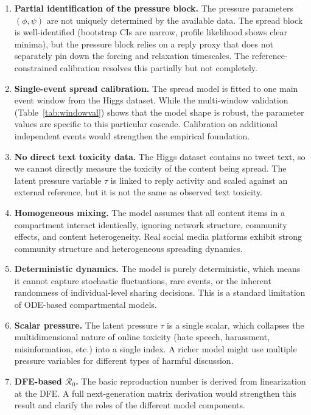 \documentclass[11pt]{article}
\begin{document}
\begin{enumerate}[leftmargin=1.5em]
    \item \textbf{Partial identification of the pressure block.} The pressure parameters $(\phi, \psi)$ are not uniquely determined by the available data. The spread block is well-identified (bootstrap CIs are narrow, profile likelihood shows clear minima), but the pressure block relies on a reply proxy that does not separately pin down the forcing and relaxation timescales. The reference-constrained calibration resolves this partially but not completely.

    \item \textbf{Single-event spread calibration.} The spread model is fitted to one main event window from the Higgs dataset. While the multi-window validation (Table~\ref{tab:windowval}) shows that the model shape is robust, the parameter values are specific to this particular cascade. Calibration on additional independent events would strengthen the empirical foundation.

    \item \textbf{No direct text toxicity data.} The Higgs dataset contains no tweet text, so we cannot directly measure the toxicity of the content being spread. The latent pressure variable $\tau$ is linked to reply activity and scaled against an external reference, but it is not the same as observed text toxicity.

    \item \textbf{Homogeneous mixing.} The model assumes that all content items in a compartment interact identically, ignoring network structure, community effects, and content heterogeneity. Real social media platforms exhibit strong community structure and heterogeneous spreading dynamics.

    \item \textbf{Deterministic dynamics.} The model is purely deterministic, which means it cannot capture stochastic fluctuations, rare events, or the inherent randomness of individual-level sharing decisions. This is a standard limitation of ODE-based compartmental models.

    \item \textbf{Scalar pressure.} The latent pressure $\tau$ is a single scalar, which collapses the multidimensional nature of online toxicity (hate speech, harassment, misinformation, etc.) into a single index. A richer model might use multiple pressure variables for different types of harmful discussion.

    \item \textbf{DFE-based $\mathcal{R}_0$.} The basic reproduction number is derived from linearization at the DFE. A full next-generation matrix derivation would strengthen this result and clarify the roles of the different model components.
\end{enumerate}
\end{document}
